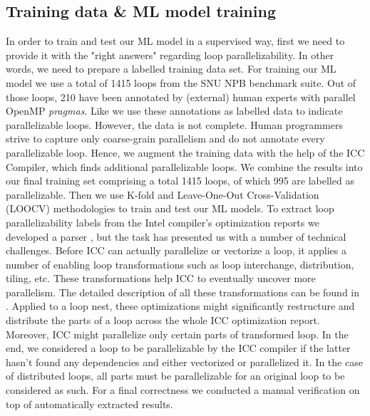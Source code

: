 \subsection{Training data \& ML model training}
\label{loop_classification_labels}
\quad In order to train and test our ML model in a supervised way, first we need to provide it with the "right answers" regarding loop parallelizability. In other words, we need to prepare a labelled training data set. For training our ML model we use a total of 1415 loops from the SNU NPB benchmark suite. Out of those loops, 210 have been annotated by (external) human experts with parallel OpenMP \textit{pragmas}. Like \cite{fried_ea:2013:icmla} we use these annotations as labelled data to indicate parallelizable loops. However, the data is not complete. Human programmers strive to capture only coarse-grain parallelism and do not annotate every parallelizable loop. Hence, we augment the training data with the help of the ICC Compiler, which finds additional parallelizable loops. We combine the results into our final training set comprising a total 1415 loops, of which 995 are labelled as parallelizable. Then we use K-fold and Leave-One-Out Cross-Validation (LOOCV) methodologies to train and test our ML models.\newline\null
\quad To extract loop parallelizability labels from the Intel compiler's optimization reports we developed a parser \cite{github-icc-parser}, but the task has presented us with a number of technical challenges. Before ICC can actually parallelize or vectorize a loop, it applies a number of enabling loop transformations such as loop interchange, distribution, tiling, etc. These transformations help ICC to eventually uncover more parallelism. The detailed description of all these transformations can be found in \cite{Bacon:1994:CTH:197405.197406}. Applied to a loop nest, these optimizations might significantly restructure and distribute the parts of a loop across the whole ICC optimization report. Moreover, ICC might parallelize only certain parts of transformed loop. In the end, we considered a loop to be parallelizable by the ICC compiler if the latter hasn't found any dependencies and either vectorized or parallelized it. In the case of distributed loops, all parts must be parallelizable for an original loop to be considered as such. For a final correctness we conducted a manual verification on top of automatically extracted results.\newline\null
